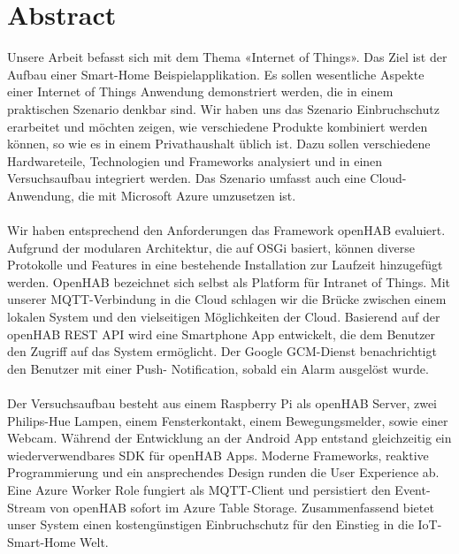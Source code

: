
\chapter*{Abstract}
Unsere Arbeit befasst sich mit dem Thema «Internet of Things». Das Ziel ist der Aufbau einer Smart-Home Beispielapplikation. Es sollen wesentliche Aspekte einer Internet of Things Anwendung demonstriert werden, die in einem praktischen Szenario denkbar sind. Wir haben uns das Szenario Einbruchschutz erarbeitet und möchten zeigen, wie verschiedene Produkte kombiniert werden können, so wie es in einem Privathaushalt üblich ist. Dazu sollen verschiedene Hardwareteile, Technologien und Frameworks analysiert und in einen Versuchsaufbau integriert werden. Das Szenario umfasst auch eine Cloud-Anwendung, die mit Microsoft Azure umzusetzen ist.
\\ \\
Wir haben entsprechend den Anforderungen das Framework openHAB evaluiert. Aufgrund der modularen Architektur, die auf OSGi basiert, können diverse Protokolle und Features in eine bestehende Installation zur Laufzeit hinzugefügt werden. OpenHAB bezeichnet sich selbst als Platform für Intranet of Things. Mit unserer MQTT-Verbindung in die Cloud schlagen wir die Brücke zwischen einem lokalen System und den vielseitigen Möglichkeiten der Cloud. Basierend auf der openHAB REST API wird eine Smartphone App entwickelt, die dem Benutzer den Zugriff auf das System ermöglicht. Der Google GCM-Dienst benachrichtigt den Benutzer mit einer Push- Notification, sobald ein Alarm ausgelöst wurde.
\\ \\
Der Versuchsaufbau besteht aus einem Raspberry Pi als openHAB Server, zwei Philips-Hue Lampen, einem Fensterkontakt, einem Bewegungsmelder, sowie einer Webcam. Während der Entwicklung an der Android App entstand gleichzeitig ein wiederverwendbares SDK für openHAB Apps. Moderne Frameworks, reaktive Programmierung und ein ansprechendes Design runden die User Experience ab. Eine Azure Worker Role fungiert als MQTT-Client und persistiert den Event-Stream von openHAB sofort im Azure Table Storage. Zusammenfassend bietet unser System einen kostengünstigen Einbruchschutz für den Einstieg in die IoT-Smart-Home Welt.